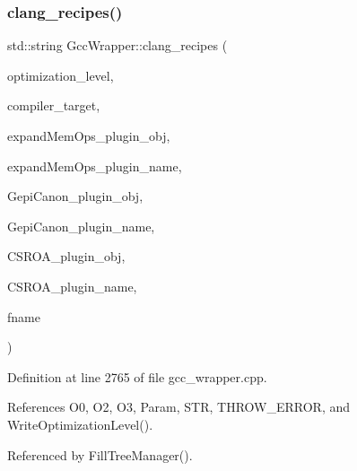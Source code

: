 \subsubsection{\texorpdfstring{clang\+\_\+recipes()}{clang\_recipes()}}
{\footnotesize\ttfamily std\+::string Gcc\+Wrapper\+::clang\+\_\+recipes (\begin{DoxyParamCaption}\item[{const \hyperlink{gcc__wrapper_8hpp_a0f57d29a8e8442ddf6d2cd8577c6788d}{Gcc\+Wrapper\+\_\+\+Optimization\+Set}}]{optimization\+\_\+level,  }\item[{const \hyperlink{gcc__wrapper_8hpp_abb9d9a5cb3a1bf5d402dbc841a6708aa}{Gcc\+Wrapper\+\_\+\+Compiler\+Target}}]{compiler\+\_\+target,  }\item[{const std\+::string \&}]{expand\+Mem\+Ops\+\_\+plugin\+\_\+obj,  }\item[{const std\+::string \&}]{expand\+Mem\+Ops\+\_\+plugin\+\_\+name,  }\item[{const std\+::string \&}]{Gepi\+Canon\+\_\+plugin\+\_\+obj,  }\item[{const std\+::string \&}]{Gepi\+Canon\+\_\+plugin\+\_\+name,  }\item[{const std\+::string \&}]{C\+S\+R\+O\+A\+\_\+plugin\+\_\+obj,  }\item[{const std\+::string \&}]{C\+S\+R\+O\+A\+\_\+plugin\+\_\+name,  }\item[{const std\+::string \&}]{fname }\end{DoxyParamCaption})\hspace{0.3cm}{\ttfamily [private]}}



Definition at line 2765 of file gcc\+\_\+wrapper.\+cpp.



References O0, O2, O3, Param, S\+TR, T\+H\+R\+O\+W\+\_\+\+E\+R\+R\+OR, and Write\+Optimization\+Level().



Referenced by Fill\+Tree\+Manager().

